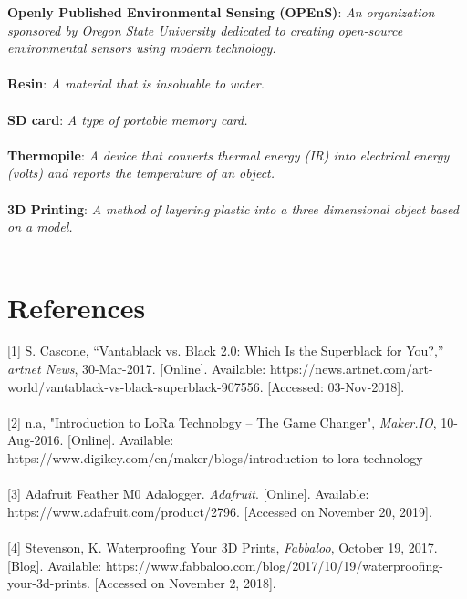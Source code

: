 \documentclass[10pt,draftclsnofoot,onecolumn,letterpaper]{article}
\begin{document}
\textbf{Openly Published Environmental Sensing (OPEnS)}: \textit{An organization sponsored by Oregon State University dedicated to creating open-source environmental sensors using modern technology.}\\\\
\textbf{Resin}: \textit{A material that is insoluable to water.}\\\\
\textbf{SD card}: \textit{A type of portable memory card.}\\\\
\textbf{Thermopile}: \textit{A device that converts thermal energy (IR) into electrical energy (volts) and reports the temperature of an object.}\\\\
\textbf{3D Printing}: \textit{A method of layering plastic into a three dimensional object based on a model.}\\\\




\section{References}
{[}1] S. Cascone, “Vantablack vs. Black 2.0: Which Is the Superblack for You?,” \textit{artnet News}, 30-Mar-2017. [Online]. Available: https://news.artnet.com/art-world/vantablack-vs-black-superblack-907556. [Accessed: 03-Nov-2018].\\
\\{[}2] n.a, "Introduction to LoRa Technology – The Game Changer", \textit{Maker.IO}, 10-Aug-2016. [Online]. Available: https://www.digikey.com/en/maker/blogs/introduction-to-lora-technology\\
\\{[}3] Adafruit Feather M0 Adalogger. \textit{Adafruit}. [Online]. Available: https://www.adafruit.com/product/2796. [Accessed on November 20, 2019].\\
\\{[}4] Stevenson, K. Waterproofing Your 3D Prints, \textit{Fabbaloo}, October 19, 2017. [Blog]. Available: https://www.fabbaloo.com/blog/2017/10/19/waterproofing-your-3d-prints. [Accessed on November 2, 2018]. \\
\end{document}
